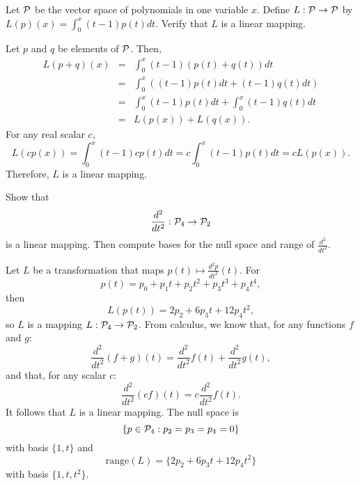 \documentclass{ximera}
\begin{document}
\begin{exercise} \label{c7.2.6}
Let ${\cal P}$ be the vector space of polynomials in one variable
$x$.  Define $L:{\cal P}\to {\cal P}$ by $L(p)(x)=\int_0^x(t-1)p(t)dt$.
Verify that $L$ is a linear mapping.

\begin{solution}

Let $p$ and $q$ be elements of ${\cal P}$.  Then,
\[ \begin{array}{rcl}
L(p + q)(x) & = & \int_0^x(t - 1)(p(t) + q(t))dt \\
& = & \int_0^x((t - 1)p(t)dt + (t - 1)q(t)dt) \\
& = & \int_0^x(t - 1)p(t)dt + \int_0^x(t - 1)q(t)dt \\
& = & L(p(x)) + L(q(x)). \end{array} \]
For any real scalar $c$,
\[ L(cp(x)) = \int_0^x(t - 1)cp(t)dt = c\int_0^x(t - 1)p(t)dt
= cL(p(x)). \]
Therefore, $L$ is a linear mapping.





\end{solution}
\end{exercise}

\AEXER

\begin{exercise}  \label{A8.1.1}
Show that
\[
\frac{d^2}{dt^2}:{\cal P}_4\to{\cal P}_2
\]
is a linear mapping.  Then compute bases for the null space  
and range of $\frac{d^2}{dt^2}$.

\begin{solution}

\soln Let $L$ be a transformation that maps $p(t) \mapsto
\frac{d^2p}{dt^2}(t)$.  For 
\[
p(t) =  p_0 + p_1t + p_2t^2 + p_3t^3+p_4t^4,
\]
then
\[
L(p(t)) = 2p_2 + 6p_3t + 12p_4t^2,
\]
so $L$ is a mapping $L:{\cal P}_4 \rightarrow {\cal P}_2$.  From calculus, we
know that, for any functions $f$ and $g$:
\[ 
\frac{d^2}{dt^2}(f + g)(t) = \frac{d^2}{dt^2}f(t) + \frac{d^2}{dt^2}g(t), 
\]
and that, for any scalar $c$:
\[ 
\frac{d^2}{dt^2}(cf)(t) = c\frac{d^2}{dt^2}f(t). 
\]
It follows that $L$ is a linear mapping.  The null space is
\[
\{p\in  {\cal P}_4: p_2=p_3=p_4=0\} 
\]
with basis $\{1,t\}$ and 
\[
\text{range}(L) =\{2p_2 + 6p_3 t +12 p_4 t^2\} 
\]
with basis $\{1,t,t^2\}$.
\end{solution}
\end{exercise}
\end{document}
